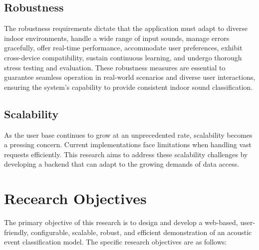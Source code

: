 \subsection{Robustness}


The robustness requirements dictate that the application must adapt to diverse indoor environments, handle a wide range of input sounds, manage errors gracefully, offer real-time performance, accommodate user preferences, exhibit cross-device compatibility, sustain continuous learning, and undergo thorough stress testing and evaluation. These robustness measures are essential to guarantee seamless operation in real-world scenarios and diverse user interactions, ensuring the system's capability to provide consistent indoor sound classification.

\subsection{Scalability}
As the user base continues to grow at an unprecedented rate, scalability becomes a pressing concern\cite{9746093}. Current implementations face limitations when handling vast requests efficiently. This research aims to address these scalability challenges by developing a backend that can adapt to the growing demands of data access.

\section{Recearch Objectives}

The primary objective of this research is to design and develop a web-based, user-friendly, configurable, scalable, robust, and efficient demonstration of an acoustic event classification model. The specific research objectives are as follows:

